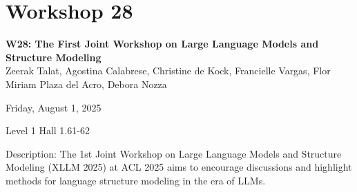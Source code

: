 \clearpage


\section[W28: The First Joint Workshop on Large Language Models and Structure Modeling]{Workshop 28}
\label{workshop_28}

\begin{center}
    {\Large \textbf{W28: The First Joint Workshop on Large Language Models and Structure Modeling }}\\

Zeerak Talat, Agostina Calabrese, Christine de Kock, Francielle Vargas, Flor Miriam Plaza del Acro, Debora Nozza

    Friday, August 1, 2025

Level 1 Hall 1.61-62

\end{center}

Description: The 1st Joint Workshop on Large Language Models and Structure Modeling (XLLM 2025) at ACL 2025 aims to encourage discussions and highlight methods for language structure modeling in the era of LLMs.  
